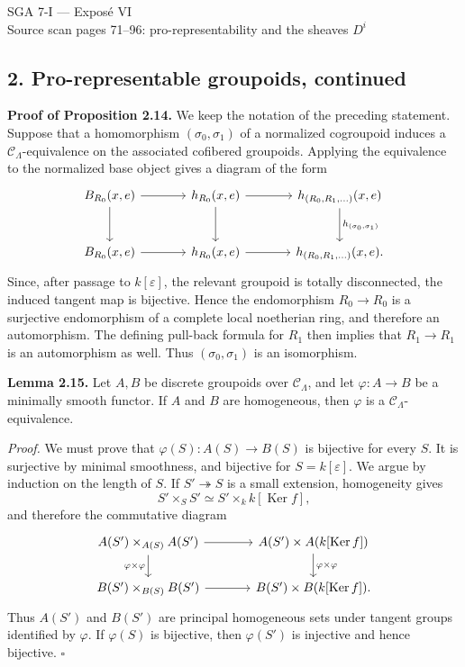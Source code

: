 \documentclass[11pt]{article}
\providecommand{\Ker}{\operatorname{Ker}}
\providecommand{\cC}{\mathcal C}
\begin{document}
\begin{center}
{\Large SGA 7-I — Exposé VI}\\[0.3em]
{\large Source scan pages 71--96: pro-representability and the sheaves \(D^i\)}
\end{center}

\subsection*{2. Pro-representable groupoids, continued}

\textbf{Proof of Proposition 2.14.}  We keep the notation of the preceding statement.  Suppose that a homomorphism \((\sigma_0,\sigma_1)\) of a normalized cogroupoid induces a \(\cC_\Lambda\)-equivalence on the associated cofibered groupoids.  Applying the equivalence to the normalized base object gives a diagram of the form
\[
\begin{tikzcd}[column sep=large,row sep=large]
 B_{R_0}(x,e) \arrow[r] \arrow[d] & h_{R_0}(x,e) \arrow[r] \arrow[d] & h_{(R_0,R_1,\ldots)}(x,e) \arrow[d,"h_{(\sigma_0,\sigma_1)}"] \\
 B_{R_0}(x,e) \arrow[r] & h_{R_0}(x,e) \arrow[r] & h_{(R_0,R_1,\ldots)}(x,e).
\end{tikzcd}
\]
Since, after passage to \(k[\varepsilon]\), the relevant groupoid is totally disconnected, the induced tangent map is bijective.  Hence the endomorphism \(R_0\to R_0\) is a surjective endomorphism of a complete local noetherian ring, and therefore an automorphism.  The defining pull-back formula for \(R_1\) then implies that \(R_1\to R_1\) is an automorphism as well.  Thus \((\sigma_0,\sigma_1)\) is an isomorphism.

\textbf{Lemma 2.15.}  Let \(A,B\) be discrete groupoids over \(\cC_\Lambda\), and let \(\varphi:A\to B\) be a minimally smooth functor.  If \(A\) and \(B\) are homogeneous, then \(\varphi\) is a \(\cC_\Lambda\)-equivalence.

\textit{Proof.}  We must prove that \(\varphi(S):A(S)\to B(S)\) is bijective for every \(S\).  It is surjective by minimal smoothness, and bijective for \(S=k[\varepsilon]\).  We argue by induction on the length of \(S\).  If \(S'\twoheadrightarrow S\) is a small extension, homogeneity gives
\[
 S'\times_S S' \simeq S'\times_k k[\Ker f],
\]
and therefore the commutative diagram
\[
\begin{tikzcd}[column sep=large]
 A(S')\times_{A(S)}A(S') \arrow[r] \arrow[d,"\varphi\times\varphi"'] & A(S')\times A(k[\Ker f]) \arrow[d,"\varphi\times\varphi"] \\
 B(S')\times_{B(S)}B(S') \arrow[r] & B(S')\times B(k[\Ker f]).
\end{tikzcd}
\]
Thus \(A(S')\) and \(B(S')\) are principal homogeneous sets under tangent groups identified by \(\varphi\).  If \(\varphi(S)\) is bijective, then \(\varphi(S')\) is injective and hence bijective. \(\square\)
\end{document}
